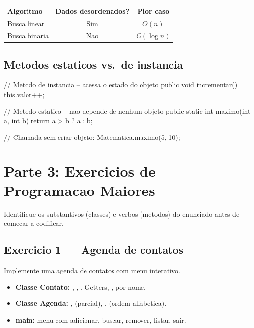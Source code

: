 \documentclass[11pt,a4paper]{article}
\begin{document}
\begin{center}
\begin{tabular}{l c c}
\toprule
\textbf{Algoritmo} & \textbf{Dados desordenados?} & \textbf{Pior caso} \\
\midrule
Busca linear  & Sim & $O(n)$ \\
Busca binaria & Nao & $O(\log n)$ \\
\bottomrule
\end{tabular}
\end{center}

\subsection{Metodos estaticos vs.\ de instancia}

\begin{javacode}
// Metodo de instancia -- acessa o estado do objeto
public void incrementar() { this.valor++; }

// Metodo estatico -- nao depende de nenhum objeto
public static int maximo(int a, int b) { return a > b ? a : b; }

// Chamada sem criar objeto:
Matematica.maximo(5, 10);
\end{javacode}

\section{Parte 3: Exercicios de Programacao Maiores}

\begin{destaque}[Dica]
Identifique os substantivos (classes) e verbos (metodos) do enunciado antes de comecar a codificar.
\end{destaque}

\subsection{Exercicio 1 --- Agenda de contatos}

Implemente uma agenda de contatos com menu interativo.

\begin{itemize}
  \item \textbf{Classe Contato:} , , . Getters, ,  por nome.
  \item \textbf{Classe Agenda:} ,  (parcial), ,  (ordem alfabetica).
  \item \textbf{main:} menu com adicionar, buscar, remover, listar, sair.
\end{itemize}
\end{document}
